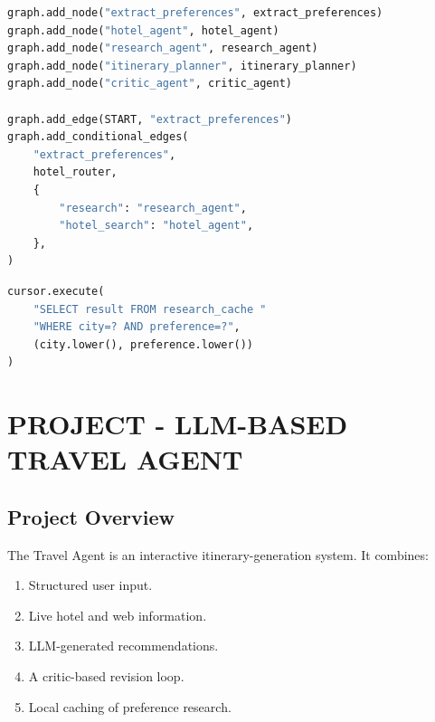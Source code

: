 \documentclass[12pt,a4paper]{report}
\begin{document}
\begin{lstlisting}[language=Python,caption={LangGraph workflow entry and critic routing}]
graph.add_node("extract_preferences", extract_preferences)
graph.add_node("hotel_agent", hotel_agent)
graph.add_node("research_agent", research_agent)
graph.add_node("itinerary_planner", itinerary_planner)
graph.add_node("critic_agent", critic_agent)

graph.add_edge(START, "extract_preferences")
graph.add_conditional_edges(
    "extract_preferences",
    hotel_router,
    {
        "research": "research_agent",
        "hotel_search": "hotel_agent",
    },
)
\end{lstlisting}

\begin{lstlisting}[language=Python,caption={SQLite cache lookup and storage}]
cursor.execute(
    "SELECT result FROM research_cache "
    "WHERE city=? AND preference=?",
    (city.lower(), preference.lower())
)
\end{lstlisting}


\chapter{PROJECT - LLM-BASED TRAVEL AGENT}
\label{ch:travel-agent}

\section{Project Overview}
\label{sec:project-overview}
The Travel Agent is an interactive itinerary-generation system. It combines:
\begin{enumerate}
    \item Structured user input.
    \item Live hotel and web information.
    \item LLM-generated recommendations.
    \item A critic-based revision loop.
    \item Local caching of preference research.
\end{enumerate}
\end{document}
